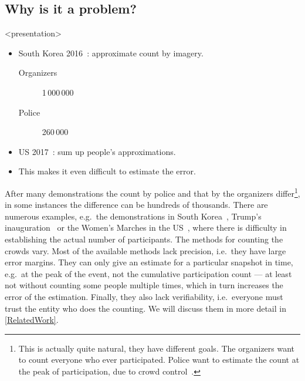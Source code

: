 \subsection<presentation>{Why is it a problem?}

\begin{frame}<presentation>
  \begin{example}
    \begin{itemize}
      \item South Korea 2016~\cite{2016DemonstrationsInSeoul}:
        approximate count by imagery.
        \begin{description}
          \item[Organizers] 1\,000\,000
          \item[Police] 260\,000
        \end{description}

        \pause

      \item US 2017~\cite{2017WomensMarchesInUS}:
        sum up people's approximations.
      \item This makes it even difficult to estimate the error.
    \end{itemize}
  \end{example}
\end{frame}

After many demonstrations the count by police and that by the organizers 
differ\footnote{%
  This is actually quite natural, they have different goals.
  The organizers want to count everyone who ever participated.
  Police want to estimate the count at the peak of participation, due to crowd 
  control~\cite{2016DemonstrationsInSeoul}.
}, in some instances the difference can be hundreds of thousands.
There are numerous examples, e.g.\ the demonstrations in South 
Korea~\cite{2016DemonstrationsInSeoul}, Trump's 
inauguration~\cite{HowWillWeKnowTrumpInauguralCrowdSize} or the Women's Marches 
in the US~\cite{2017WomensMarchesInUS}, where there is difficulty in 
establishing the actual number of participants.
The methods for counting the crowds vary.
Most of the available methods lack precision, i.e.\ they have large error 
margins.
They can only give an estimate for a particular snapshot in time, e.g.\ at the 
peak of the event, not the cumulative participation count --- at least not 
without counting some people multiple times, which in turn increases the error 
of the estimation.
Finally, they also lack verifiability, i.e.\ everyone must trust the entity who
does the counting.
We will discuss them in more detail in \cref{RelatedWork}.

